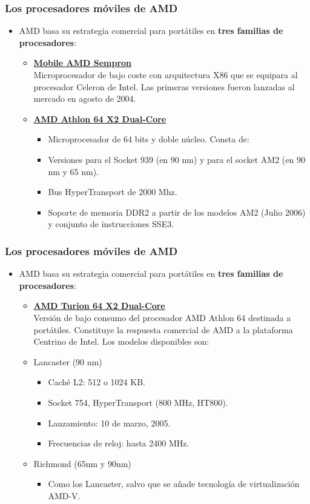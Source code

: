 \frame
{
\frametitle{Los procesadores móviles de AMD}
\begin{itemize}
 \item AMD basa su estrategia comercial para portátiles en \textbf{tres familias de procesadores}:

	\begin{itemize}
		\item \textbf{\underline{Mobile AMD Sempron}}\\
		Microprocesador de bajo coste con arquitectura X86 que se equipara al procesador Celeron de Intel. Las primeras versiones fueron lanzadas al mercado en agosto de 2004.
		\item \textbf{\underline{AMD \underline{Athlon} 64 X2 Dual-Core}}
		\begin{itemize}
			\item Microprocesador de 64 bits y doble núcleo. Consta de:
			\item Versiones para el Socket 939 (en 90 nm) y para el socket AM2 (en 90 nm y 65 nm).
			\item Bus HyperTransport de 2000 Mhz.
			\item Soporte de memoria DDR2 a partir de los modelos AM2 (Julio 2006) y conjunto de instrucciones SSE3.
		\end{itemize}
	\end{itemize}
\end{itemize}
}

\frame
{
\frametitle{Los procesadores móviles de AMD}
\begin{itemize}
 \item AMD basa su estrategia comercial para portátiles en \textbf{tres familias de procesadores}:

	\begin{itemize}
		\item \textbf{\underline{AMD \underline{Turion} 64 X2 Dual-Core}}\\
		Versión de bajo consumo del procesador AMD Athlon 64 destinada a portátiles. Constituye la respuesta comercial de AMD a la plataforma Centrino de Intel. Los modelos disponibles son:\vspace*{0.3cm}

		\item Lancaster (90 nm)
			\begin{itemize}
			\item Caché L2: 512 o 1024 KB.
			\item Socket 754, HyperTransport (800 MHz, HT800).
			\item Lanzamiento: 10 de marzo, 2005.
			\item Frecuencias de reloj: hasta 2400 MHz.
			\end{itemize}

		\item Richmond (65nm y 90nm)
			\begin{itemize}
			\item Como los Lancaster, salvo que se añade tecnología de virtualización AMD-V.
			\end{itemize}
	\end{itemize}
\end{itemize}
}

